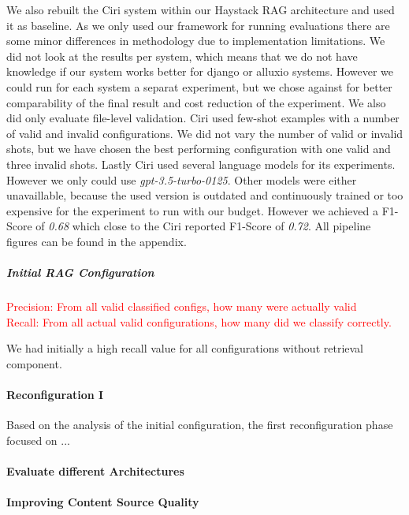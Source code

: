 We also rebuilt the Ciri system within our Haystack RAG architecture and used it as baseline. As we only used our framework for running evaluations there are some minor differences in methodology due to implementation limitations. We did not look at the results per system, which means that we do not have knowledge if our system works better for django or alluxio systems. However we could run for each system a separat experiment, but we chose against for better comparability of the final result and cost reduction of the experiment. We also did only evaluate file-level validation. Ciri used few-shot examples with a number of valid and invalid configurations. We did not vary the number of valid or invalid shots, but we have chosen the best performing configuration with one valid and three invalid shots. Lastly Ciri used several language models for its experiments. However we only could use \textit{gpt-3.5-turbo-0125}\cite{OpenAI_2022}. Other models were either unavaillable, because the used version is outdated and continuously trained or too expensive for the experiment to run with our budget. However we achieved a F1-Score of \textit{0.68} which close to the Ciri reported F1-Score of \textit{0.72}. All pipeline figures can be found in the appendix.

\subparagraph{Initial RAG Configuration} 


\textcolor{red}{Precision: From all valid classified configs, how many were actually valid\\Recall: From all actual valid configurations, how many did we classify correctly.}

We had initially a high recall value for all configurations without retrieval component.

\paragraph{Reconfiguration I} \label{sec:exp_reconfig_1}
Based on the analysis of the initial configuration, the first reconfiguration phase focused on ...


\paragraph{Evaluate different Architectures}

\paragraph{Improving Content Source Quality}

